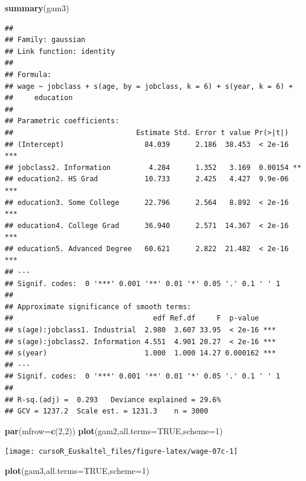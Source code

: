 \documentclass[]{book}
\newenvironment{Shaded}{\begin{snugshade}}{\end{snugshade}}
\newcommand{\KeywordTok}[1]{\textcolor[rgb]{0.13,0.29,0.53}{\textbf{#1}}}
\newcommand{\DataTypeTok}[1]{\textcolor[rgb]{0.13,0.29,0.53}{#1}}
\newcommand{\DecValTok}[1]{\textcolor[rgb]{0.00,0.00,0.81}{#1}}
\newcommand{\OtherTok}[1]{\textcolor[rgb]{0.56,0.35,0.01}{#1}}
\newcommand{\NormalTok}[1]{#1}
\begin{document}
\begin{Shaded}
\begin{Highlighting}[]
\KeywordTok{summary}\NormalTok{(gam3)}
\end{Highlighting}
\end{Shaded}

\begin{verbatim}
## 
## Family: gaussian 
## Link function: identity 
## 
## Formula:
## wage ~ jobclass + s(age, by = jobclass, k = 6) + s(year, k = 6) + 
##     education
## 
## Parametric coefficients:
##                             Estimate Std. Error t value Pr(>|t|)    
## (Intercept)                   84.039      2.186  38.453  < 2e-16 ***
## jobclass2. Information         4.284      1.352   3.169  0.00154 ** 
## education2. HS Grad           10.733      2.425   4.427  9.9e-06 ***
## education3. Some College      22.796      2.564   8.892  < 2e-16 ***
## education4. College Grad      36.940      2.571  14.367  < 2e-16 ***
## education5. Advanced Degree   60.621      2.822  21.482  < 2e-16 ***
## ---
## Signif. codes:  0 '***' 0.001 '**' 0.01 '*' 0.05 '.' 0.1 ' ' 1
## 
## Approximate significance of smooth terms:
##                                 edf Ref.df     F  p-value    
## s(age):jobclass1. Industrial  2.980  3.607 33.95  < 2e-16 ***
## s(age):jobclass2. Information 4.551  4.901 20.27  < 2e-16 ***
## s(year)                       1.000  1.000 14.27 0.000162 ***
## ---
## Signif. codes:  0 '***' 0.001 '**' 0.01 '*' 0.05 '.' 0.1 ' ' 1
## 
## R-sq.(adj) =  0.293   Deviance explained = 29.6%
## GCV = 1237.2  Scale est. = 1231.3    n = 3000
\end{verbatim}

\begin{Shaded}
\begin{Highlighting}[]
\KeywordTok{par}\NormalTok{(}\DataTypeTok{mfrow=}\KeywordTok{c}\NormalTok{(}\DecValTok{2}\NormalTok{,}\DecValTok{2}\NormalTok{))}
\KeywordTok{plot}\NormalTok{(gam2,}\DataTypeTok{all.terms=}\OtherTok{TRUE}\NormalTok{,}\DataTypeTok{scheme=}\DecValTok{1}\NormalTok{)}
\end{Highlighting}
\end{Shaded}

\begin{center}\texttt{[image: cursoR\_Euskaltel\_files/figure-latex/wage-07c-1]} \end{center}

\begin{Shaded}
\begin{Highlighting}[]
\KeywordTok{plot}\NormalTok{(gam3,}\DataTypeTok{all.terms=}\OtherTok{TRUE}\NormalTok{,}\DataTypeTok{scheme=}\DecValTok{1}\NormalTok{)}
\end{Highlighting}
\end{Shaded}
\end{document}
